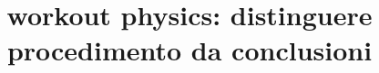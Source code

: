 \documentclass[oneside,20pt,fleqn,extrafontsizes]{memoir}
\title{workout physics: distinguere procedimento da conclusioni}
\begin{document}
\pagestyle{mystyle}%
\renewcommand*{\contentsname}{\label{toc}{Table of Contents}}%
\maketitle
\listoftodos
\tableofcontents%
\end{document}
